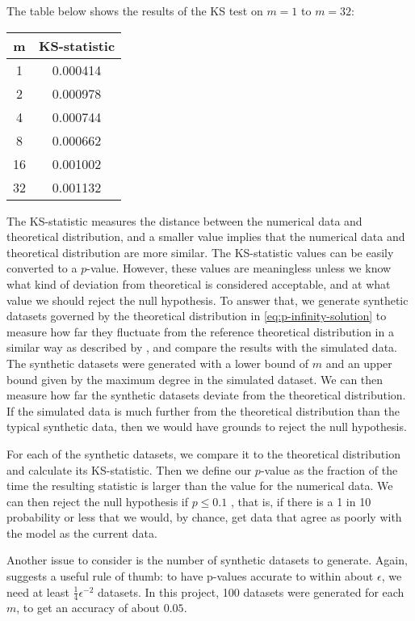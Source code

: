 The table below shows the results of the KS test on $m = 1$ to $m=32$:

\begin{center}
\begin{tabular}{ c | c }
 m &  KS-statistic \\ 
 \hline
 1 & 0.000414 \\  
 2 & 0.000978 \\
 4 & 0.000744 \\
 8 & 0.000662 \\
 16 & 0.001002 \\
 32 & 0.001132 \\  
\end{tabular}
\label{table:ks-test}
\end{center}

The KS-statistic measures the distance between the numerical data and theoretical distribution, and a smaller value implies that the numerical data and theoretical distribution are more similar. The KS-statistic values can be easily converted to a $p$-value. However, these values are meaningless unless we know what kind of deviation from theoretical is considered acceptable, and at what value we should reject the null hypothesis. To answer that, we generate synthetic datasets governed by the theoretical distribution in \autoref{eq:p-infinity-solution} to measure how far they fluctuate from the reference theoretical distribution in a similar way as described by \citet{Clauset2009}, and compare the results with the simulated data. The synthetic datasets were generated with a lower bound of $m$ and an upper bound given by the maximum degree in the simulated dataset. We can then measure how far the synthetic datasets deviate from the theoretical distribution. If the simulated data is much further from the theoretical distribution than the typical synthetic data, then we would have grounds to reject the null hypothesis. 

For each of the synthetic datasets, we compare it to the theoretical distribution and calculate its KS-statistic. Then we define our $p$-value as the fraction of the time the resulting statistic is larger than the value for the numerical data. We can then reject the null hypothesis if $p \leq 0.1$ \citep{Clauset2009}, that is, if there is a 1 in 10 probability or less that we would, by chance, get data that agree as poorly with the model as the current data. 

Another issue to consider is the number of synthetic datasets to generate. Again, \citet{Clauset2009} suggests a useful rule of thumb: to have p-values accurate to within about $\epsilon$, we need at least $\frac{1}{4}\epsilon^{-2}$ datasets. In this project, 100 datasets were generated for each $m$, to get an accuracy of about $0.05$. 

